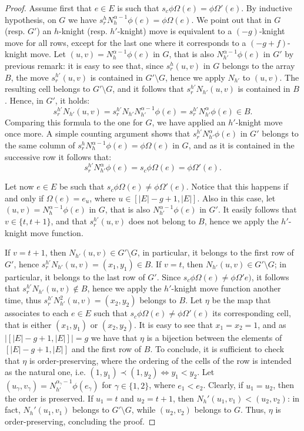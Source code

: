 \documentclass{amsart}
\theoremstyle{definition}
\numberwithin{equation}{section}
\begin{document}
\begin{proof}
 
Assume first that $e \in E$ is such that $s_c \phi\Omega (e)  =\phi \Omega'(e)$.  By inductive hypothesis, on $G$ we have $ s_r^hN_h^{\alpha-1} \phi (e) = \phi\Omega(e)$. 
We point out that in $G$  (resp. $G'$) an $h$-knight (resp. $h'$-knight) move is equivalent to a $(-g)$-knight move for all rows, except for the last one where it corresponds to a $(-g+f)$-knight move.
Let $(u,v) = N_h^{\alpha-1} \phi (e)$ in $G$, that is also $N_{h'}^{\alpha-1} \phi (e)$ in $G'$ by previous remark: it is easy to see that, since $s_r^h(u,v)$ in $G$ belongs to the array $B$, the move $s_r^{h'}(u,v)$ is contained in $G' \setminus G$, hence we apply $N_{h'}$ to $(u,v)$. The resulting cell belongs to $G' \setminus G$, and it follows that $s_r^{h'}N_{h'}(u,v)$ is contained in $B$. Hence, in $G'$, it holds:
\[
s_r^{h'}N_{h'}(u,v) = s_r^{h'}N_{h'}N_{h'}^{\alpha-1}\phi(e) =  s_r^{h'}N_{h'}^{\alpha}\phi(e)  \in B.
\] 
Comparing this formula to the one  for $G$, we have applied  an $h'$-knight move once more. A simple counting argument shows that $s_r^{h'}N_{h'}^{\alpha}\phi(e)$ in $G'$ belongs to the same column of  $ s_r^hN_h^{\alpha-1} \phi (e) = \phi\Omega(e)$ in $G$, and as it is contained in the successive row it follows that:
 \[
 s_r^{h'}N_{h'}^{\alpha}\phi(e) = s_c \phi\Omega (e)  =\phi \Omega'(e).
 \]

Let now $e \in E$ be such that $s_c \phi\Omega (e)  \neq \phi \Omega'(e)$. Notice that this happens if and only if  $\Omega (e) = e_u$, where $u \in[|E|-g+1,|E|]$. Also in this case, let $(u,v) =N_h^{\alpha-1}	\phi(e)$ in $G$, that is also $N_{h'}^{\alpha-1}\phi(e)$ in $G'$. It easily follows that $v \in \{t,t+1\}$, and that $s_r^{h'}(u,v)$ does not belong to $B$, hence we apply the $h'$-knight move function.

If $v = t+1$, then $N_{h'}(u,v) \in G' \setminus G$, in particular, it belongs to the first row of $G'$, hence $s_r^{h'}N_{h'}(u,v) = (x_1,y_1) \in B$. 
If $v = t$, then $N_{h'}(u,v) \in G' \setminus G$; in particular, it belongs to the last row of $G'$. Since $s_c \phi\Omega (e)  \neq \phi \Omega'e)$, it follows that $s_r^{h'}N_{h'}(u,v) \not\in B$, hence we apply the $h'$-knight move function another time, thus $s_r^{h'} N^2_{h'}(u,v) = (x_2,y_2)$ belongs to $B$. Let $\eta $ be the map that associates to each $e \in E $  such that $s_c \phi\Omega (e)  \neq \phi \Omega'(e)$ its corresponding cell, that is either $(x_1,y_1)$ or $(x_2,y_2)$.
It is easy to see that $x_1 = x_2 = 1$, and as $|[|E|-g+1,|E|]| = g$ we have that $\eta$ is a bijection between the elements of $[|E|-g+1,|E|]$ and the first row of $B$. To conclude, it is sufficient to check that $\eta$ is order-preserving, where the ordering of the cells of the row is intended as the natural one, i.e. $(1,y_1) \prec (1,y_2) \Leftrightarrow y_1 <y_2$. 
Let $(u_\gamma,v_\gamma) = N_{h'}^{\alpha_\gamma-1}\phi(e_\gamma)$ for $\gamma \in \{1,2\}$, where $e_1 < e_2$. Clearly, if $u_1 = u_2$, then  the order is preserved. If $u_1 = t$ and $u_2 = t+1$, then $N_h'(u_1,v_1) < (u_2,v_2)$: in fact, $N_h'(u_1,v_1)$ belongs to $G' \setminus G$, while $(u_2,v_2)$ belongs to $G$.
Thus, $\eta$ is order-preserving, concluding the proof.
\end{proof}
\end{document}
